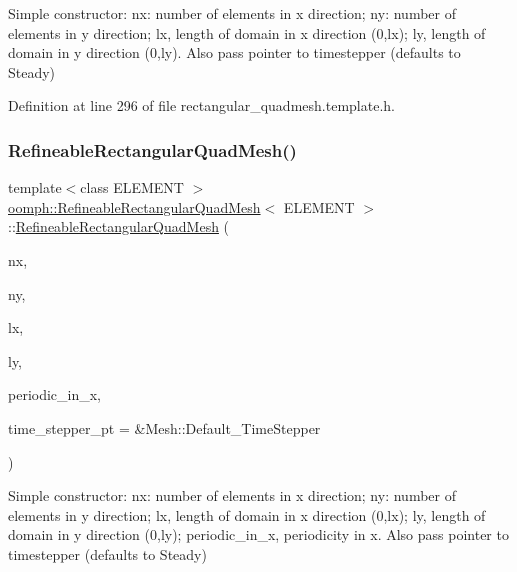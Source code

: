 Simple constructor\+: nx\+: number of elements in x direction; ny\+: number of elements in y direction; lx, length of domain in x direction (0,lx); ly, length of domain in y direction (0,ly). Also pass pointer to timestepper (defaults to Steady) 



Definition at line 296 of file rectangular\+\_\+quadmesh.\+template.\+h.

\mbox{\label{classoomph_1_1RefineableRectangularQuadMesh_aa49c7a67bd80678dd088430d7fc0bfc9}} 
\subsubsection{\texorpdfstring{Refineable\+Rectangular\+Quad\+Mesh()}{RefineableRectangularQuadMesh()}\hspace{0.1cm}{\footnotesize\ttfamily [2/4]}}
{\footnotesize\ttfamily template$<$class E\+L\+E\+M\+E\+NT $>$ \\
\hyperlink{classoomph_1_1RefineableRectangularQuadMesh}{oomph\+::\+Refineable\+Rectangular\+Quad\+Mesh}$<$ E\+L\+E\+M\+E\+NT $>$\+::\hyperlink{classoomph_1_1RefineableRectangularQuadMesh}{Refineable\+Rectangular\+Quad\+Mesh} (\begin{DoxyParamCaption}\item[{const unsigned \&}]{nx,  }\item[{const unsigned \&}]{ny,  }\item[{const double \&}]{lx,  }\item[{const double \&}]{ly,  }\item[{const bool \&}]{periodic\+\_\+in\+\_\+x,  }\item[{Time\+Stepper $\ast$}]{time\+\_\+stepper\+\_\+pt = {\ttfamily \&Mesh\+:\+:Default\+\_\+TimeStepper} }\end{DoxyParamCaption})\hspace{0.3cm}{\ttfamily [inline]}}



Simple constructor\+: nx\+: number of elements in x direction; ny\+: number of elements in y direction; lx, length of domain in x direction (0,lx); ly, length of domain in y direction (0,ly); periodic\+\_\+in\+\_\+x, periodicity in x. Also pass pointer to timestepper (defaults to Steady) 



